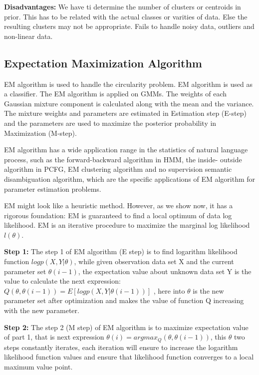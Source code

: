 \documentclass{bmcart}
\begin{document}
{\bf Disadvantages:} We have ti determine the number of clusters or centroids in prior. This has to be related with the actual classes or varities of data. Else the resulting clusters may not be appropriate. Fails to handle noisy data, outliers and non-linear data. 

\subsection{Expectation Maximization Algorithm}
\label{ssec:emAlgorithm}

EM algorithm is used to handle the circularity problem. EM algorithm is used as a classifier. The EM algorithm is applied on GMMs. The weights of each Gaussian mixture component is calculated along with the mean and the variance. The mixture weights and parameters are estimated in Estimation step (E-step) and the parameters are used to maximize the posterior probability in Maximization (M-step).
	
EM algorithm has a wide application range in the statistics of natural language process, such as the forward-backward algorithm in HMM, the inside- outside algorithm in PCFG, EM clustering algorithm and no supervision semantic disambiguation algorithm, which are the specific applications of EM algorithm for parameter estimation problems.

EM might look like a heuristic method. However, as we show now, it has a rigorous foundation: EM is guaranteed to find a local optimum of data log likelihood.  EM is an iterative procedure to maximize the marginal log likelihood $l(\theta)$. 

{\bf Step 1:} The step 1 of EM algorithm (E step) is to find logarithm likelihood function $log p(X, Y | \theta )$, while given observation data set X and the current parameter set $\theta (i-1)$, the expectation value about unknown data set Y is the value to calculate the next expression: $ Q( \theta , \theta (i-1)) = E [log p(X,Y | \theta(i-1))]$ , here into $\theta$ is the new parameter set after optimization and makes the value of function Q increasing with the new parameter.

{\bf Step 2:} The step 2 (M step) of EM algorithm is to maximize expectation value of part 1, that is next expression $ \theta (i) = argmax_Q (\theta , \theta (i-1))$, this $\theta$ two steps constantly iterates, each iteration will ensure to increase the logarithm likelihood function values and ensure that likelihood function converges to a local maximum value point.
\end{document}
